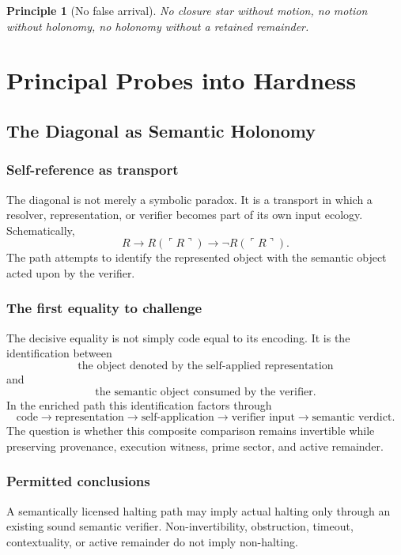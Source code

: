 \documentclass[12pt,openany]{book}
\newtheorem{principle}[definition]{Principle}
\theoremstyle{remark}
\begin{document}
\begin{principle}[No false arrival]
No closure star without motion, no motion without holonomy, no holonomy without a retained remainder.
\end{principle}

\part{Principal Probes into Hardness}

\chapter{The Diagonal as Semantic Holonomy}
\label{ch:diagonal}

\section{Self-reference as transport}
The diagonal is not merely a symbolic paradox. It is a transport in which a resolver, representation, or verifier becomes part of its own input ecology. Schematically,
\[
R
\longrightarrow
R(\ulcorner R\urcorner)
\longrightarrow
\neg R(\ulcorner R\urcorner).
\]
The path attempts to identify the represented object with the semantic object acted upon by the verifier.

\section{The first equality to challenge}
The decisive equality is not simply code equal to its encoding. It is the identification between
\[
\text{the object denoted by the self-applied representation}
\]
and
\[
\text{the semantic object consumed by the verifier}.
\]
In the enriched path this identification factors through
\[
\text{code}
\to
\text{representation}
\to
\text{self-application}
\to
\text{verifier input}
\to
\text{semantic verdict}.
\]
The question is whether this composite comparison remains invertible while preserving provenance, execution witness, prime sector, and active remainder.

\section{Permitted conclusions}
A semantically licensed halting path may imply actual halting only through an existing sound semantic verifier. Non-invertibility, obstruction, timeout, contextuality, or active remainder do not imply non-halting.
\end{document}
